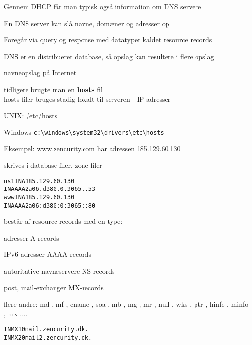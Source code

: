 \documentclass[Screen16to9,17pt]{foils}
\begin{document}


\begin{list1}
\item Gennem DHCP får man typisk også information om DNS servere
\item En DNS server kan slå navne, domæner og adresser op
\item Foregår via query og response med datatyper kaldet resource records
\item DNS er en distribueret database, så opslag kan resultere i flere opslag
\end{list1}


\begin{list1}
\item navneopslag på Internet
\item tidligere brugte man en {\bfseries hosts} fil\\
hosts filer bruges stadig lokalt til serveren - IP-adresser
\item UNIX: /etc/hosts
\item Windows \verb+c:\windows\system32\drivers\etc\hosts+
\item Eksempel: www.zencurity.com har adressen 185.129.60.130
\item skrives i database filer, zone filer
\end{list1}

\begin{alltt}
ns1     IN      A       185.129.60.130
        IN      AAAA    2a06:d380:0:3065::53
www     IN      A       185.129.60.130
        IN      AAAA    2a06:d380:0:3065::80
\end{alltt}



\begin{list1}
  \item består af resource records med en type:
    \begin{list2}
\item adresser A-records
\item IPv6 adresser AAAA-records
\item autoritative navneservere NS-records
\item post, mail-exchanger MX-records
\item flere andre: md ,  mf ,  cname ,  soa ,
                  mb , mg ,  mr ,  null ,  wks ,  ptr ,
                  hinfo ,  minfo ,  mx ....
\end{list2}
\end{list1}
\begin{alltt}
        IN      MX      10      mail.zencurity.dk.
        IN      MX      20      mail2.zencurity.dk.
\end{alltt}
\end{document}
